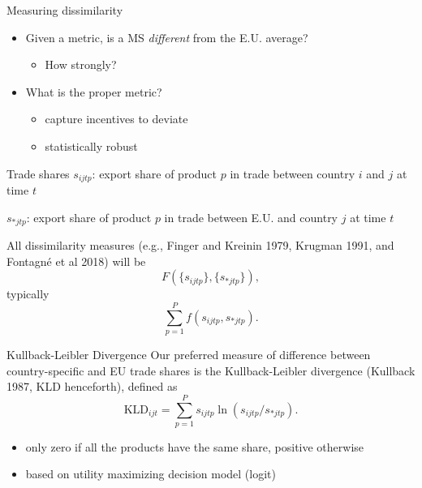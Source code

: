 \documentclass[
  ignorenonframetext,
  aspectratio=16,
]{beamer}
\providecommand{\tightlist}{%
  \setlength{\itemsep}{0pt}\setlength{\parskip}{0pt}}
\begin{document}
\begin{frame}{Measuring dissimilarity}
\protect\hypertarget{measuring-dissimilarity}{}
\begin{itemize}
\tightlist
\item
  Given a metric, is a MS \emph{different} from the E.U. average?

  \begin{itemize}
  \tightlist
  \item
    How strongly?
  \end{itemize}
\item
  What is the proper metric?

  \begin{itemize}
  \tightlist
  \item
    capture incentives to deviate
  \item
    statistically robust
  \end{itemize}
\end{itemize}
\end{frame}

\begin{frame}{Trade shares}
\protect\hypertarget{trade-shares}{}
\(s_{ijtp}\): export share of product \(p\) in trade between country
\(i\) and \(j\) at time \(t\)

\(s_{*jtp}\): export share of product \(p\) in trade between E.U. and
country \(j\) at time \(t\)

All dissimilarity measures (e.g., Finger and Kreinin 1979, Krugman 1991,
and Fontagné et al 2018) will be \[
F(\{s_{ijtp}\}, \{s_{*jtp}\}),
\] typically \[
\sum_{p=1}^P f(s_{ijtp}, s_{*jtp}).
\]
\end{frame}

\begin{frame}{Kullback-Leibler Divergence}
\protect\hypertarget{kullback-leibler-divergence}{}
Our preferred measure of difference between country-specific and EU
trade shares is the Kullback-Leibler divergence (Kullback 1987, KLD
henceforth), defined as \begin{equation}
    \text{KLD}_{ijt} =
    \sum_{p=1}^P
        s_{ijtp}
        \ln(s_{ijtp} / s_{*jtp}).
\end{equation}

\begin{itemize}
\tightlist
\item
  only zero if all the products have the same share, positive otherwise
\item
  based on utility maximizing decision model (logit)
\end{itemize}
\end{frame}
\end{document}
